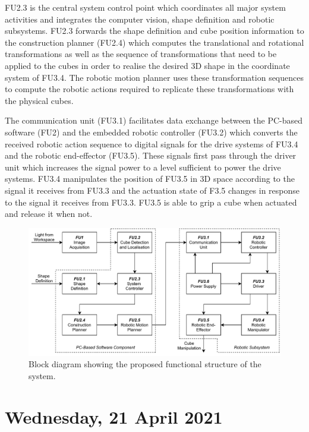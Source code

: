 FU2.3 is the central system control point which coordinates all major system activities and integrates the computer vision, shape definition and robotic subsystems. FU2.3 forwards the shape definition and cube position information to the construction planner (FU2.4) which computes the translational and rotational transformations as well as the sequence of transformations that need to be applied to the cubes in order to realise the desired 3D shape in the coordinate system of FU3.4. The robotic motion planner uses these transformation sequences to compute the robotic actions required to replicate these transformations with the physical cubes.
 
The communication unit (FU3.1) facilitates data exchange between the PC-based software (FU2) and the embedded robotic controller (FU3.2) which converts the received robotic action sequence to digital signals for the drive systems of FU3.4 and the robotic end-effector (FU3.5). These signals first pass through the driver unit which increases the signal power to a level sufficient to power the drive systems. FU3.4 manipulates the position of FU3.5 in 3D space according to the signal it receives from FU3.3 and the actuation state of F3.5 changes in response to the signal it receives from FU3.3. FU3.5 is able to grip a cube when actuated and release it when not.

\begin{figure}[H]
  \centering
  \includegraphics[width=0.8\linewidth]{figures/functional-block-diagram.pdf}
  \caption{Block diagram showing the proposed functional structure of the system.}
  \label{fig:functional_block_diagram}
\end{figure}

\pendsign

\section[2021/04/21]{Wednesday, 21 April 2021}


